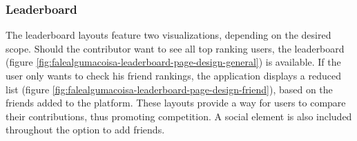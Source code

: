 \clearpage
\subsubsection{Leaderboard}

The leaderboard layouts feature two visualizations, depending on the desired scope. Should the contributor want to see all top ranking users, the leaderboard (figure \ref{fig:falealgumacoisa-leaderboard-page-design-general}) is available. If the user only wants to check his friend rankings, the application displays a reduced list (figure \ref{fig:falealgumacoisa-leaderboard-page-design-friend}), based on the friends added to the platform. These layouts provide a way for users to compare their contributions, thus promoting competition. A social element is also included throughout the option to add friends.


